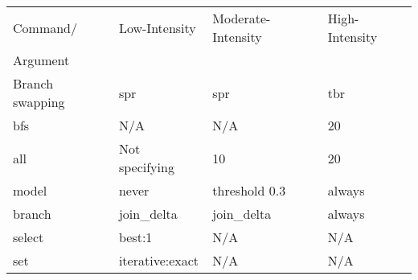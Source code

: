 \begin{center}
\begin{tabular}{| l  l  l p{}|}
	\hline
	Command/ & Low-Intensity & Moderate-Intensity & High-Intensity \\ 
	Argument &               &                    &                \\
    \hline \hline
	Branch swapping & spr & spr & tbr \\
	bfs & N/A & N/A & 20 \\
	all & Not specifying & 10 & 20 \\
	model & never & threshold 0.3 & always \\
	branch & join\_delta & join\_delta & always \\
	select & best:1 & N/A & N/A \\
	set & iterative:exact & N/A & N/A \\
	\hline	
\end{tabular}
\end{center}









